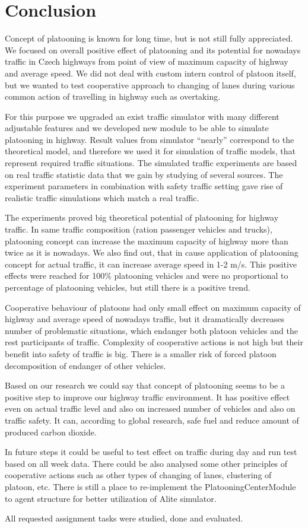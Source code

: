 \chapter{Conclusion}

Concept of platooning is known for long time, but is not still fully appreciated. We focused on overall positive effect of platooning and its potential for nowadays traffic in Czech highways from point of view of maximum capacity of highway and average speed. We did not deal with custom intern control of platoon itself, but we wanted to test cooperative approach to changing of lanes during various common action of travelling in highway such as overtaking.

For this purpose we upgraded an exist traffic simulator with many different adjustable features and we developed new module to be able to simulate platooning in highway. Result values from simulator “nearly” correspond to the theoretical model, and therefore we used it for simulation of traffic models, that represent required traffic situations. The simulated traffic experiments are based on real traffic statistic data that we gain by studying of several sources. The experiment parameters in combination with safety traffic setting gave rise of realistic traffic simulations which match a real traffic.

The experiments proved big theoretical potential of platooning for highway traffic. In same traffic composition (ration passenger vehicles and trucks), platooning concept can increase the maximum capacity of highway more than twice as it is nowadays. We also find out, that in cause application of platooning concept for actual traffic, it can increase average speed in 1-2 m/s. This positive effects were reached for 100\% platooning vehicles and were no proportional to percentage of platooning vehicles, but still there is a positive trend.

Cooperative behaviour of platoons had only small effect on maximum capacity of highway and average speed of nowadays traffic, but it dramatically decreases number of problematic situations, which endanger both platoon vehicles and the rest participants of traffic. Complexity of cooperative actions is not high but their benefit into safety of traffic is big. There is a smaller risk  of forced platoon decomposition of endanger of other vehicles.

Based on our research we could say that concept of platooning seems to be a positive step to improve our highway traffic environment. It has positive effect even on actual traffic level and also on increased number of vehicles and also on traffic safety. It can, according to global research, safe fuel and reduce amount of produced carbon dioxide.

In future steps it could be useful to test effect on traffic during day and run test based on all week data. There could be also analysed some other principles of cooperative actions such as other types of changing of lanes, clustering of platoon, etc. There is still a place to re-implement the PlatooningCenterModule to agent structure for better utilization of Alite simulator.

All requested assignment tasks were studied, done and evaluated.